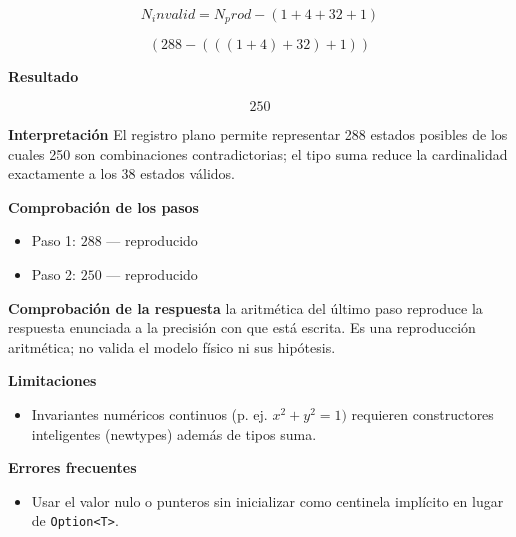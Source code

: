 \documentclass{book}
\begin{document}
\begin{tcolorbox}[title={Problema resuelto}, studiumworked, breakable]
\begin{enumerate}
\[
N_invalid = N_prod - (1 + 4 + 32 + 1)
\]

\[
\left(288-\left(\left(\left(1+4\right)+32\right)+1\right)\right)
\]
\end{enumerate}

\noindent\textbf{Resultado}

\[
250
\]

\noindent\textbf{Interpretación}
El registro plano permite representar 288 estados posibles de los cuales 250 son combinaciones contradictorias; el tipo suma reduce la cardinalidad exactamente a los 38 estados válidos.

\noindent\textbf{Comprobación de los pasos}
\begin{itemize}
\item Paso 1: $288$ — reproducido
\item Paso 2: $250$ — reproducido
\end{itemize}

\noindent\textbf{Comprobación de la respuesta} la aritmética del último paso reproduce la respuesta enunciada a la precisión con que está escrita. Es una reproducción aritmética; no valida el modelo físico ni sus hipótesis.

\noindent\textbf{Limitaciones}
\begin{itemize}
\item Invariantes numéricos continuos (p. ej. \(x^2 + y^2 = 1)\) requieren constructores inteligentes (newtypes) además de tipos suma.
\end{itemize}

\noindent\textbf{Errores frecuentes}
\begin{itemize}
\item Usar el valor nulo o punteros sin inicializar como centinela implícito en lugar de \texttt{Option<T>}.
\end{itemize}
\end{tcolorbox}
\end{document}
